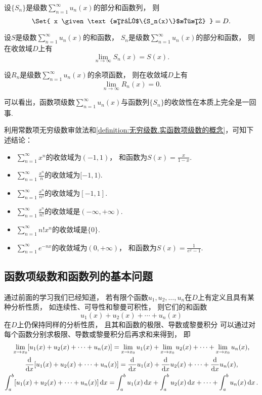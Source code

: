 \begin{proposition}
设\(\{S_n\}\)是级数\(\sum_{n=1}^\infty u_n(x)\)的部分和函数列，
则\[
	\Set{ x \given \text{数列$\{S_n(x)\}$收敛} } = D.
\]
\end{proposition}
\begin{proposition}
设\(S\)是级数\(\sum_{n=1}^\infty u_n(x)\)的和函数，
\(S_n\)是级数\(\sum_{n=1}^\infty u_n(x)\)的部分和函数，
则在收敛域\(D\)上有\[
	\lim_{n\to\infty} S_n(x) = S(x).
\]
\end{proposition}
\begin{proposition}
设\(R_n\)是级数\(\sum_{n=1}^\infty u_n(x)\)的余项函数，
则在收敛域\(D\)上有\[
	\lim_{n\to\infty} R_n(x) = 0.
\]
\end{proposition}
\begin{remark}
可以看出，函数项级数\(\sum_{n=1}^\infty u_n(x)\)与函数列\(\{S_n\}\)的收敛性在本质上完全是一回事.
\end{remark}

\begin{example}
利用常数项无穷级数审敛法和\cref{definition:无穷级数.实函数项级数的概念}，可知下述结论：
\begin{itemize}
	\item \(\sum_{n=1}^\infty x^n\)的收敛域为\((-1,1)\)，
	和函数为\(S(x) = \frac{x}{1-x}\).
	\item \(\sum_{n=1}^\infty \frac{x^n}{n}\)的收敛域为\([-1,1)\).
	\item \(\sum_{n=1}^\infty \frac{x^n}{n^2}\)的收敛域为\([-1,1]\).
	\item \(\sum_{n=1}^\infty \frac{x^n}{n!}\)的收敛域是\((-\infty,+\infty)\).
	\item \(\sum_{n=1}^\infty n! x^n\)的收敛域是\(\{0\}\).
	\item \(\sum_{n=1}^\infty e^{-nx}\)的收敛域为\((0,+\infty)\)，
	和函数为\(S(x) = \frac1{e^x-1}\).
\end{itemize}
\end{example}

\subsection{函数项级数和函数列的基本问题}
通过前面的学习我们已经知道，
若有限个函数\(u_1,u_2,\dotsc,u_n\)在\(D\)上有定义且具有某种分析性质，
如连续性、可导性和黎曼可积性，
则它们的和函数\[
	u_1(x) + u_2(x) + \dotsb + u_n(x)
\]在\(D\)上仍保持同样的分析性质，
且其和函数的极限、导数或黎曼积分
可以通过对每个函数分别求极限、导数或黎曼积分后再求和来得到，
即\begin{gather*}
	\lim_{x \to x_0} [u_1(x) + u_2(x) + \dotsb + u_n(x)]
	= \lim_{x \to x_0} u_1(x)
	+ \lim_{x \to x_0} u_2(x)
	+ \dotsb
	+ \lim_{x \to x_0} u_n(x), \\
	\dv{x} [u_1(x) + u_2(x) + \dotsb + u_n(x)]
	= \dv{x} u_1(x)
	+ \dv{x} u_2(x)
	+ \dotsb
	+ \dv{x} u_n(x), \\
	\int_a^b [u_1(x) + u_2(x) + \dotsb + u_n(x)] \dd{x}
	= \int_a^b u_1(x) \dd{x}
	+ \int_a^b u_2(x) \dd{x}
	+ \dotsb
	+ \int_a^b u_n(x) \dd{x}.
\end{gather*}

